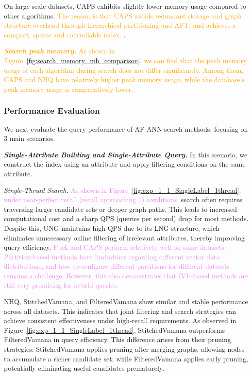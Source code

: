 \documentclass[sigconf, nonacm]{acmart}
\begin{document}
	On large-scale datasets, CAPS exhibits slightly lower memory usage compared to other algorithms. \textcolor{orange}{The reason is that CAPS avoids redundant storage and graph structure overhead through hierarchical partitioning and AFT, and achieves a compact, sparse and controllable index. }.
	
	\textit{\textbf{ \textcolor{orange}{Search peak memory.}}}
	 \textcolor{orange}{As shown in Figure~\ref{fig:search_memory_mb_comparison}, we can find that the peak memory usage of each algorithm during search does not differ significantly. Among them, CAPS and NHQ have relatively higher peak memory usage, while the database's peak memory usage is comparatively lower.}
	
	\subsubsection{Performance Evaluation}
	
	
	
	
	We next evaluate the query performance of AF-ANN search methods, focusing on 3 main scenarios.
	
	\textit{\textbf{Single-Attribute Building and Single-Attribute Query.}}
	In this scenario, we construct the index using an attribute and apply filtering conditions on the same attribute.

	
	\textit{Single-Thread Search.}  
	\textcolor{violet}{As shown in Figure~\ref{fig:exp_1_1_SingleLabel_1thread}, under near-perfect recall (recall approaching 1) conditions,} search often requires traversing larger candidate sets or deeper graph paths. This leads to increased computational cost and a sharp QPS (queries per second) drop for most methods. Despite this, UNG maintains high QPS due to its LNG structure, which eliminates unnecessary online filtering of irrelevant attributes, thereby improving query efficiency. \textcolor{violet}{Puck and CAPS perform relatively well on some datasets. Partition-based methods have limitations regarding different vector data distributions, and how to configure different partitions for different datasets remains a challenge. However, this also demonstrates that IVF-based methods are still very promising for hybrid queries.}
	
	NHQ, StitchedVamana, and FilteredVamana show similar and stable performance across all datasets. This indicates that joint filtering and search strategies can achieve consistent effectiveness under high-recall requirements. As observed in Figure~\ref{fig:exp_1_1_SingleLabel_1thread}, StitchedVamana outperforms FilteredVamana in query efficiency. This difference arises from their pruning strategies: StitchedVamana applies pruning after merging graphs, allowing nodes to accumulate a richer candidate set; while FilteredVamana applies early pruning, potentially eliminating useful candidates prematurely.
	
\end{document}
